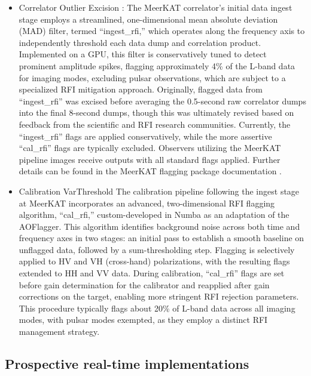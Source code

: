 \begin{itemize}
\item Correlator Outlier Excision :
The MeerKAT correlator's initial data ingest stage employs a streamlined, one-dimensional mean absolute deviation (MAD) filter, termed “ingest\_rfi,” which operates along the frequency axis to independently threshold each data dump and correlation product. Implemented on a GPU, this filter is conservatively tuned to detect prominent amplitude spikes, flagging approximately 4\% of the L-band data for imaging modes, excluding pulsar observations, which are subject to a specialized RFI mitigation approach. Originally, flagged data from “ingest\_rfi” was excised before averaging the 0.5-second raw correlator dumps into the final 8-second dumps, though this was ultimately revised based on feedback from the scientific and RFI research communities. Currently, the “ingest\_rfi” flags are applied conservatively, while the more assertive “cal\_rfi” flags are typically excluded. Observers utilizing the MeerKAT pipeline images receive outputs with all standard flags applied. Further details can be found in the MeerKAT flagging package documentation \citep{hugo2022tricolouroptimizedsumthresholdflagger}.

\item Calibration VarThreshold
The calibration pipeline following the ingest stage at MeerKAT incorporates an advanced, two-dimensional RFI flagging algorithm, “cal\_rfi,” custom-developed in Numba as an adaptation of the AOFlagger. This algorithm identifies background noise across both time and frequency axes in two stages: an initial pass to establish a smooth baseline on unflagged data, followed by a sum-thresholding step. Flagging is selectively applied to HV and VH (cross-hand) polarizations, with the resulting flags extended to HH and VV data. During calibration, “cal\_rfi” flags are set before gain determination for the calibrator and reapplied after gain corrections on the target, enabling more stringent RFI rejection parameters. This procedure typically flags about 20\% of L-band data across all imaging modes, with pulsar modes exempted, as they employ a distinct RFI management strategy.


\end{itemize}

\subsection{Prospective real-time implementations}
\label{subsection:hardware:catalog:prospective}

